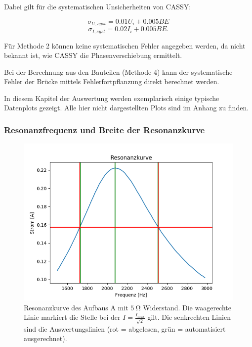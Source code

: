 \documentclass[12pt,a4paper]{article}
\begin{document}
Dabei gilt für die systematischen Unsicherheiten von CASSY:

\begin{equation}
	\sigma_{U, syst} = 0.01 U_i + 0.005 BE
\end{equation}
\begin{equation}
	\sigma_{I, syst} = 0.02 I_i + 0.005 BE.
\end{equation}

Für Methode 2 können keine systematischen Fehler angegeben werden, da nicht bekannt ist, wie CASSY die Phasenverschiebung ermittelt.

Bei der Berechnung aus den Bauteilen (Methode 4) kann der systematische Fehler der Brücke mittels Fehlerfortpflanzung direkt berechnet werden.

In diesem Kapitel der Auswertung werden exemplarisch einige typische Datenplots gezeigt. Alle hier nicht dargestellten Plots sind im Anhang zu finden.


\subsubsection{Resonanzfrequenz und Breite der Resonanzkurve}

\begin{figure}
	\centering
	\includegraphics[scale=0.8]{Bilder/Serie_Resonanzkurve_A_5.png}
	\caption{Resonanzkurve des Aufbaus A mit $\SI{5}{\ohm}$ Widerstand. Die waagerechte Linie markiert die Stelle bei der $I = \frac{I_{max}}{\sqrt{2}}$ gilt. Die senkrechten Linien sind die Auswertungslinien (rot = abgelesen, grün = automatisiert ausgerechnet).}
	\label{fig:Serie_Resonanzkurve_A_5}
\end{figure}
\end{document}
